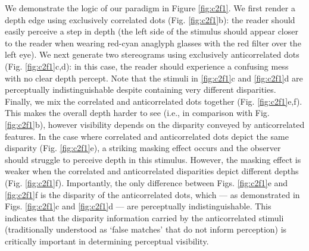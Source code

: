 We demonstrate the logic of our paradigm in Figure \ref{fig:c2f1}. We first render a depth edge using exclusively correlated dots (Fig. \ref{fig:c2f1}b): the reader should easily perceive a step in depth (the left side of the stimulus should appear closer to the reader when wearing red-cyan anaglyph glasses with the red filter over the left eye). We next generate two stereograms using exclusively anticorrelated dots (Fig. \ref{fig:c2f1}c,d): in this case, the reader should experience a confusing mess with no clear depth percept. Note that the stimuli in \ref{fig:c2f1}c and \ref{fig:c2f1}d are perceptually indistinguishable despite containing very different disparities. Finally, we mix the correlated and anticorrelated dots together (Fig. \ref{fig:c2f1}e,f). This makes the overall depth harder to see (i.e., in comparison with Fig. \ref{fig:c2f1}b), however visibility depends on the disparity conveyed by anticorrelated features. In the case where correlated and anticorrelated dots depict the same disparity (Fig. \ref{fig:c2f1}e), a striking masking effect occurs and the observer should struggle to perceive depth in this stimulus. However, the masking effect is weaker when the correlated and anticorrelated disparities depict different depths (Fig. \ref{fig:c2f1}f). Importantly, the only difference between Figs. \ref{fig:c2f1}e and \ref{fig:c2f1}f is the disparity of the anticorrelated dots, which --- as demonstrated in Figs. \ref{fig:c2f1}c and \ref{fig:c2f1}d --- are perceptually indistinguishable. This indicates that the disparity information carried by the anticorrelated stimuli (traditionally understood as `false matches' that do not inform perception) is critically important in determining perceptual visibility.

